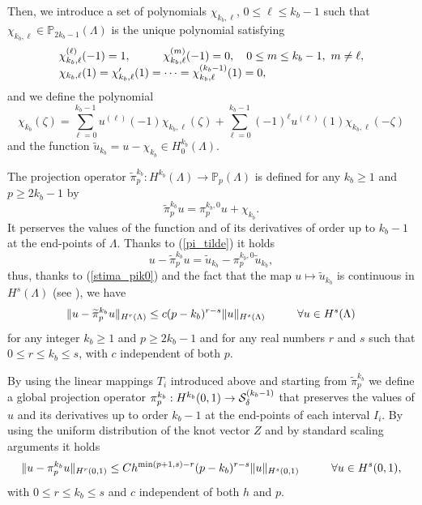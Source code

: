 \documentclass[11pt]{article}
\begin{document}
Then, we introduce a set of polynomials $\chi_{k_b,\ell}$, $0\leq \ell\leq k_b-1$ 
such that $\chi_{k_b,\ell}\in {\mathbb P}_{2k_b-1}(\Lambda)$ is the 
unique polynomial satisfying
\begin{eqnarray*}
\begin{array}{l}
\chi_{k_b,\ell}^{(\ell)}(-1)=1, \hskip 1.cm
 \chi_{k_b,\ell}^{(m)}(-1)=0,\quad 0\leq m\leq k_b-1, \ m\neq \ell,\\
\chi_{k_b,\ell}(1)=\chi_{k_b,\ell}'(1)=\cdots =\chi_{k_b,\ell}^{(k_b-1)}(1)=0,
\end{array}
\end{eqnarray*}
and we define the polynomial   
\begin{equation}\label{chi}
\chi_{k_b}(\zeta)=\sum_{\ell=0}^{k_b-1}u^{(\ell)}(-1)\chi_{k_b,\ell}(\zeta)
+\sum_{\ell=0}^{k_b-1}(-1)^{\ell}u^{(\ell)}(1)\chi_{k_b,\ell}(-\zeta)
\end{equation}
and the function $\tilde u_{k_b}=u-\chi_{k_b}\in H^{k_b}_0(\Lambda)$.

The projection operator
$\widetilde \pi_p^{k_b}:H^{k_b}(\Lambda)\to {\mathbb P}_p(\Lambda)$ is
defined for any $k_b\geq 1$ and $p\geq 2k_b-1$ by
\begin{equation}\label{pi_tilde}
\widetilde \pi_p^{k_b} u=\pi_p^{k_b,0}u+\chi_{k_b}.
\end{equation}
 It perserves the values
of the function and of its derivatives of order up to $k_b-1$ at the end-points
of $\Lambda$.  Thanks to (\ref{pi_tilde}) it holds
\begin{equation}
u-\widetilde \pi_p^{k_b} u=\tilde u_{k_b}-\pi_p^{k_b,0}\tilde u_{k_b},
\end{equation}
thus, thanks to (\ref{stima_pik0}) and the fact that the map 
$u\mapsto \tilde u_{k_b}$ is continuous in $H^s(\Lambda)$
(see \cite[formula (6.19)]{bm-handbook}), we have
\begin{equation}\label{proj_bm}
\|u-\widetilde \pi_p^{k_b} u\|_{H^r(\Lambda)}\leq 
c (p-k_b)^{r-s} \|u\|_{H^s(\Lambda)}
\hskip 1.cm \forall u\in H^s(\Lambda)
\end{equation}
for any integer $k_b\geq 1$ and $p\geq 2k_b-1$ and 
for any real numbers $r$ and $s$ such that $0\leq r\leq k_b\leq s$,
with $c$ independent of both $p$.

By using the linear mappings $T_i$ introduced above and starting from
$\widetilde \pi_p^{k_b}$
we define a global projection operator 
$\pi_p^{k_b}:H^{k_b}(0,1)\to {\cal S}_\delta^{(k_b-1)}$ that preserves the 
values of $u$ and its derivatives  up to order $k_b-1$ at the end-points 
of each interval  $I_i$. By using the uniform distribution
 of the knot vector $Z$ and 
 by standard scaling arguments it holds
\begin{equation}\label{proj_bmh}
\|u-\pi_p^{k_b} u\|_{H^r(0,1)}\leq C h^{\min(p+1,s)-r} (p-k_b)^{r-s} \|u\|_{H^s(0,1)}
\hskip 1.cm \forall u\in H^s(0,1),
\end{equation}
with $0\leq r\leq k_b\leq s$ and $c$ independent of both $h$ and $p$.
\end{document}
